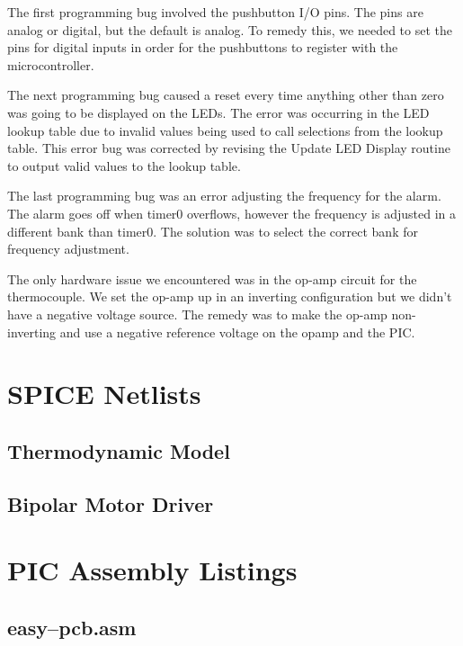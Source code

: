 \documentclass[10pt, twocolumn]{article}
\begin{document}
The first programming bug involved the pushbutton I/O pins.
The pins are analog or digital, but the default is analog.
To remedy this, we needed to set the pins for digital inputs in order for the pushbuttons to register with the microcontroller.

The next programming bug caused a reset every time anything other than zero
was going to be displayed on the LEDs.
The error was occurring in the LED lookup table due to invalid values being
used to call selections from the lookup table.
This error bug was corrected by revising the Update LED Display routine to output valid values to the lookup table.

The last programming bug was an error adjusting the frequency for the alarm.
The alarm goes off when timer0 overflows, however the frequency is adjusted
in a different bank than timer0. The solution was to select the correct bank for frequency adjustment.

The only hardware issue we encountered was in the op-amp circuit for the thermocouple.
We set the op-amp up in an inverting configuration but we didn’t have a negative voltage source.
The remedy was to make the op-amp non-inverting and use a negative reference voltage on the
opamp and the PIC.

\onecolumn
\appendix

\section{SPICE Netlists}

\subsection{Thermodynamic Model}
\label{heat-model-listing}


\subsection{Bipolar Motor Driver}
\label{motor-driver-listing}


\pagebreak
\section{PIC Assembly Listings}

\subsection{easy--pcb.asm}
\label{easy-pcb-listing}

\end{document}
